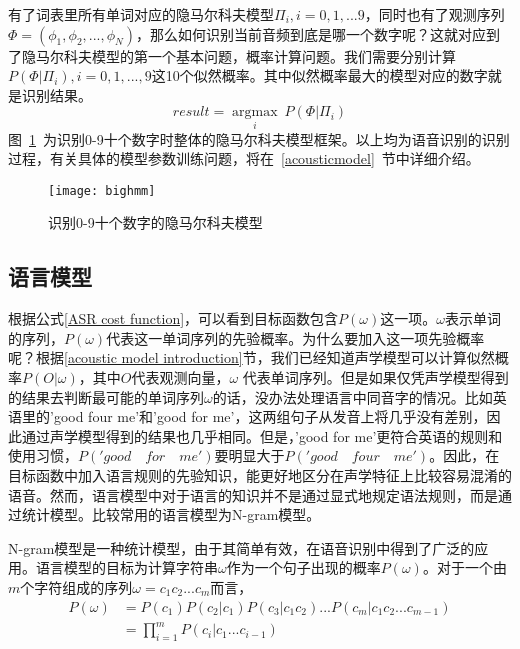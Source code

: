 有了词表里所有单词对应的隐马尔科夫模型$\Pi_i,i=0,1,...9$，同时也有了观测序列$\Phi=(\phi_1,\phi_2,...,\phi_N)$，那么如何识别当前音频到底是哪一个数字呢？这就对应到了隐马尔科夫模型的第一个基本问题，概率计算问题。我们需要分别计算$P(\Phi|\Pi_i), i=0,1,...,9$这10个似然概率。其中似然概率最大的模型对应的数字就是识别结果。
\begin{equation}result=\underset{i}{\operatorname{argmax} } ~P(\Phi|\Pi_i) \end{equation}
图~\ref{fig:bighmm}~为识别0-9十个数字时整体的隐马尔科夫模型框架。以上均为语音识别的识别过程，有关具体的模型参数训练问题，将在~\ref{acousticmodel}~节中详细介绍。
\begin{figure}[htbp]
\centering
\texttt{[image: bighmm]}
\caption{识别0-9十个数字的隐马尔科夫模型}\label{fig:bighmm}
\vspace{\baselineskip}
\end{figure}

\subsection{语言模型}
根据公式\ref{ASR cost function}，可以看到目标函数包含$P(\omega)$这一项。$\omega$表示单词的序列，$P(\omega)$代表这一单词序列的先验概率。为什么要加入这一项先验概率呢？根据\ref{acoustic model introduction}节，我们已经知道声学模型可以计算似然概率$P(O|\omega)$，其中$O$代表观测向量，$\omega$ 代表单词序列。但是如果仅凭声学模型得到的结果去判断最可能的单词序列$\omega$的话，没办法处理语言中同音字的情况。比如英语里的'good four me'和'good for me'，这两组句子从发音上将几乎没有差别，因此通过声学模型得到的结果也几乎相同。但是，'good for me'更符合英语的规则和使用习惯，$P('good\quad for\quad me')$要明显大于$P('good\quad four\quad me')$。因此，在目标函数中加入语言规则的先验知识，能更好地区分在声学特征上比较容易混淆的语音。然而，语言模型中对于语言的知识并不是通过显式地规定语法规则，而是通过统计模型。比较常用的语言模型为N-gram模型。

N-gram模型是一种统计模型，由于其简单有效，在语音识别中得到了广泛的应用。语言模型的目标为计算字符串$\omega$作为一个句子出现的概率$P(\omega)$。对于一个由$m$个字符组成的序列$\omega=c_1 c_2...c_m$而言，
\begin{equation}
\begin{aligned}
  P(\omega)& = P(c_1)P(c_2|c_1)P(c_3|c_1 c_2)...P(c_m|c_1 c_2...c_{m-1}) \\
          & = \prod\limits_{i=1}^m P(c_i|c_1...c_{i-1})
\end{aligned}
\end{equation}

